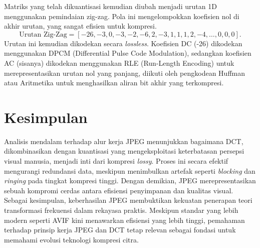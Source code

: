 \documentclass[a4paper]{article}
\begin{document}
Matriks yang telah dikuantisasi kemudian diubah menjadi urutan 1D menggunakan pemindaian zig-zag. Pola ini mengelompokkan koefisien nol di akhir urutan, yang sangat efisien untuk kompresi.
\[
  \text{Urutan Zig-Zag} = [-26, -3, 0, -3, -2, -6, 2, -3, 1, 1, 1, 2, -4, \dots, 0, 0, 0].
\]
Urutan ini kemudian dikodekan secara \textit{lossless}. Koefisien DC (-26) dikodekan menggunakan DPCM (Differential Pulse Code Modulation), sedangkan koefisien AC (sisanya) dikodekan menggunakan RLE (Run-Length Encoding) untuk merepresentasikan urutan nol yang panjang, diikuti oleh pengkodean Huffman atau Aritmetika untuk menghasilkan aliran bit akhir yang terkompresi.

\section{Kesimpulan}
Analisis mendalam terhadap alur kerja JPEG menunjukkan bagaimana DCT, dikombinasikan dengan kuantisasi yang mengeksploitasi keterbatasan persepsi visual manusia, menjadi inti dari kompresi \textit{lossy}. Proses ini secara efektif mengurangi redundansi data, meskipun menimbulkan artefak seperti \textit{blocking} dan \textit{ringing} pada tingkat kompresi tinggi. Dengan demikian, JPEG merepresentasikan sebuah kompromi cerdas antara efisiensi penyimpanan dan kualitas visual.
Sebagai kesimpulan, keberhasilan JPEG membuktikan kekuatan penerapan teori transformasi frekuensi dalam rekayasa praktis. Meskipun standar yang lebih modern seperti AVIF kini menawarkan efisiensi yang lebih tinggi, pemahaman terhadap prinsip kerja JPEG dan DCT tetap relevan sebagai fondasi untuk memahami evolusi teknologi kompresi citra.


\printbibliography
\end{document}
